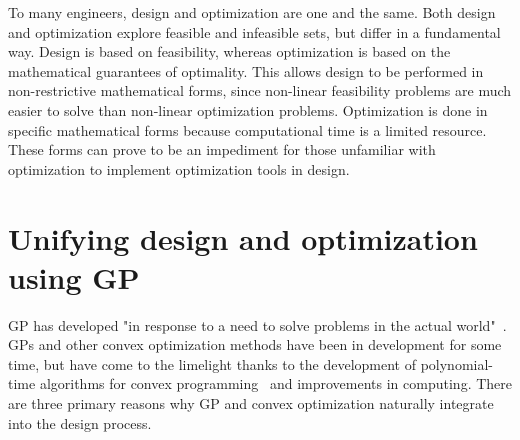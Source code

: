 To many engineers, design and optimization are one and the same. Both design and
optimization explore feasible and infeasible sets, but differ in a fundamental way.
Design is based on feasibility, whereas optimization is based on the
mathematical guarantees of optimality. This allows design to be performed
in non-restrictive mathematical forms, since non-linear feasibility problems are
much easier to solve than non-linear optimization problems. Optimization is
done in specific mathematical forms because
computational time is a limited resource. These forms can prove to be
an impediment for those unfamiliar with optimization to implement optimization
tools in design.

\section{Unifying design and optimization using \gls{GP}}

\gls{GP} has developed "in response to a need to solve problems in the actual 
world"~\cite{duffingp}. \gls{GP}s and other convex optimization methods have been
in development for some time, but have come to the limelight thanks to the development of
polynomial-time algorithms for convex programming~\cite{interior_point} and
improvements in computing. There are three primary reasons why \gls{GP} and convex
optimization naturally integrate into the design process.

